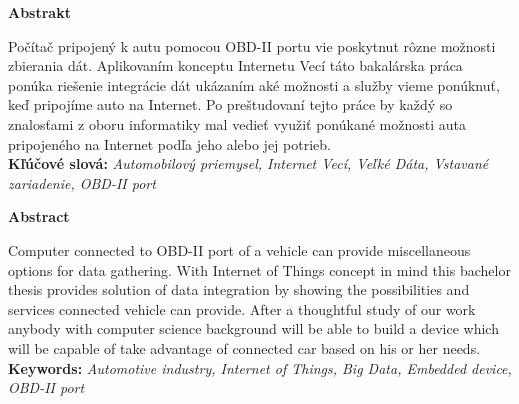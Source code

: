 {\noindent\large\bf Abstrakt}

\vspace{1.8cm}
Počítač pripojený k autu pomocou OBD-II portu vie poskytnut rôzne možnosti zbierania dát. Aplikovaním konceptu Internetu Vecí táto bakalárska práca ponúka riešenie integrácie dát ukázaním aké možnosti a služby vieme ponúknuť, keď pripojíme auto na Internet. Po preštudovaní tejto práce by každý so znalosťami z oboru informatiky mal vedieť využiť ponúkané možnosti auta pripojeného na Internet podľa jeho alebo jej potrieb.\\

{\parindent0pt \textbf{Kľúčové slová:} \emph{Automobilový priemysel, Internet Vecí, Veľké Dáta, Vstavané zariadenie, OBD-II port}}

\newpage
{\noindent\large\bf Abstract}

\vspace{1.8cm}
Computer connected to OBD-II port of a vehicle can provide miscellaneous options for data gathering. With Internet of Things concept in mind this bachelor thesis provides solution of data integration by showing the possibilities and services connected vehicle can provide. After a thoughtful study of our work anybody with computer science background will be able to build a device which will be capable of take advantage of connected car based on his or her needs.\\

{\parindent0pt \textbf{Keywords:} \emph{Automotive industry, Internet of Things, Big Data, Embedded device, OBD-II port}}


\newpage
